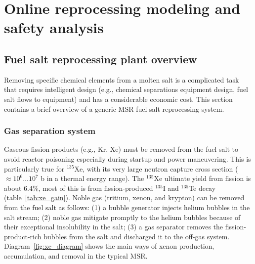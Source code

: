 \chapter[Online reprocessing modeling and safety analysis]{Online reprocessing 
modeling and safety analysis}
\section{Fuel salt reprocessing plant overview}
Removing specific chemical elements from a molten salt is a complicated 
task that requires intelligent design (e.g., chemical separations equipment 
design, fuel salt flows to equipment) and has a considerable economic cost. 
This section contains a brief overview of a generic \gls{MSR} fuel salt  
reprocessing system.

\subsection{Gas separation system}
Gaseous fission products (e.g., Kr, Xe) must be removed from the fuel salt 
to avoid reactor poisoning especially during startup and power maneuvering. 
This is particularly true for $^{135}$Xe, with its very large neutron capture 
cross section ($\approx10^6\dots10^7$ b in a thermal energy range). The 
$^{135}$Xe 
ultimate yield from fission is about 6.4\%, most of this is from 
fission-produced $^{135}$I and $^{135}$Te decay (table~\ref{tab:xe_gain}). 
Noble gas (tritium, xenon, and 
krypton) can be removed from the fuel salt as follows: (1) a bubble generator 
injects helium bubbles in the salt stream; (2) noble gas mitigate promptly 
to the helium bubbles because of their exceptional insolubility in the salt; 
(3) a gas separator removes the fission-product-rich bubbles from
the salt 
and discharged it to the off-gas system. Diagram~\ref{fig:xe_diagram} shows 
the main ways of xenon production, accumulation, and removal in the typical 
\gls{MSR}.
